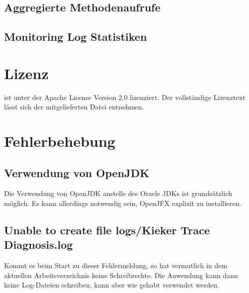\documentclass{article}
\begin{document}
  \subsection{Aggregierte Methodenaufrufe}
  \subsection{Monitoring Log Statistiken}

  \section{Lizenz}
  \KiekerTraceDiagnosis{} ist unter der Apache License Version 2.0 lizenziert. Der vollständige Lizenztext lässt sich der mitgelieferten Datei  entnehmen.

  \section{Fehlerbehebung}

  \subsection{Verwendung von OpenJDK}\label{OpenJDK}
  Die Verwendung von OpenJDK anstelle des Oracle JDKs ist grundsätzlich möglich. Es kann allerdings notwendig sein, OpenJFX explizit zu installieren.

  \subsection{Unable to create file logs/Kieker Trace Diagnosis.log}\label{LogSchreibrechte}
  Kommt es beim Start zu dieser Fehlermeldung, so hat \KiekerTraceDiagnosis{} vermutlich in dem aktuellen Arbeitsverzeichnis keine Schreibrechte.
  Die Anwendung kann dann keine Log-Dateien schreiben, kann aber wie gehabt verwendet werden.
\end{document}
